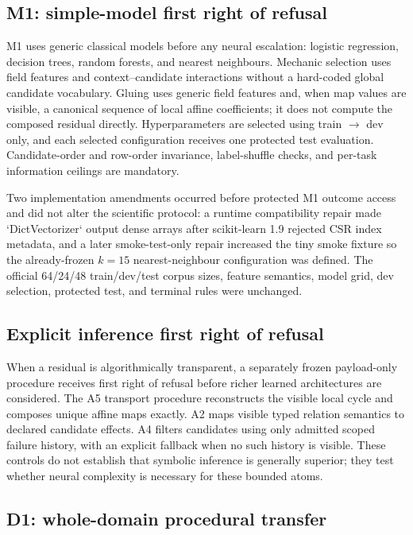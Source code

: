 \subsection{M1: simple-model first right of refusal}

M1 uses generic classical models before any neural escalation: logistic regression, decision trees, random forests, and nearest neighbours. Mechanic selection uses field features and context--candidate interactions without a hard-coded global candidate vocabulary. Gluing uses generic field features and, when map values are visible, a canonical sequence of local affine coefficients; it does not compute the composed residual directly. Hyperparameters are selected using train $\rightarrow$ dev only, and each selected configuration receives one protected test evaluation. Candidate-order and row-order invariance, label-shuffle checks, and per-task information ceilings are mandatory.

Two implementation amendments occurred before protected M1 outcome access and did not alter the scientific protocol: a runtime compatibility repair made `DictVectorizer` output dense arrays after scikit-learn 1.9 rejected CSR index metadata, and a later smoke-test-only repair increased the tiny smoke fixture so the already-frozen $k=15$ nearest-neighbour configuration was defined. The official 64/24/48 train/dev/test corpus sizes, feature semantics, model grid, dev selection, protected test, and terminal rules were unchanged.

\subsection{Explicit inference first right of refusal}

When a residual is algorithmically transparent, a separately frozen payload-only procedure receives first right of refusal before richer learned architectures are considered. The A5 transport procedure reconstructs the visible local cycle and composes unique affine maps exactly. A2 maps visible typed relation semantics to declared candidate effects. A4 filters candidates using only admitted scoped failure history, with an explicit fallback when no such history is visible. These controls do not establish that symbolic inference is generally superior; they test whether neural complexity is necessary for these bounded atoms.

\subsection{D1: whole-domain procedural transfer}

